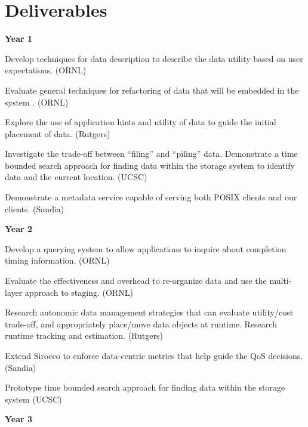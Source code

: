 \section{Deliverables}
\small

\textbf{Year 1}
\begin{tightItemize}
\item Develop  techniques for data description  to 
describe the data utility based on user expectations. (ORNL)

\item Evaluate general  techniques for refactoring of data
that will be embedded in the system . (ORNL)
\item Explore the use of application hints and utility of data to guide the initial placement of data. 
(Rutgers)
\item Investigate the trade-off between ``filing'' and ``piling'' data. 
Demonstrate a time bounded search approach for finding data within the storage system
to identify data and the current location. (UCSC)
\item Demonstrate a metadata service capable of serving both POSIX clients and our clients. (Sandia)
\end{tightItemize}
\textbf{Year 2}
\begin{tightItemize}
\item Develop a querying system to allow applications to inquire
about completion timing information. (ORNL)
\item Evaluate the effectiveness and overhead to re-organize data and use the multi-layer approach 
to staging. (ORNL)
\item Research autonomic data management strategies that
can evaluate utility/cost trade-off, and appropriately place/move data objects at runtime. 
Research runtime tracking and estimation. (Rutgers)
\item Extend Sirocco to enforce data-centric metrics that help guide the QoS decisions. (Sandia)
\item Prototype time bounded search approach for finding data within the storage system (UCSC)
\end{tightItemize}
\textbf{Year 3}
